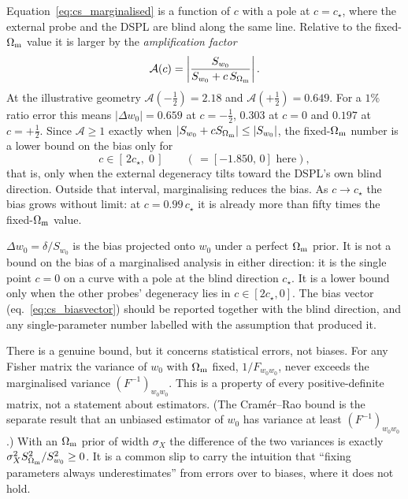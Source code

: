 Equation~\eqref{eq:cs_marginalised} is a function of $c$ with a pole at
$c=c_\star$, where the external probe and the DSPL are blind along the
same line. Relative to the fixed-$\Omega_{\mathrm{m}}$ value it is larger by the
\emph{amplification factor}
\begin{equation}
  \mathcal{A}(c)=\left|\frac{S_{w_0}}{S_{w_0}+c\,S_{\Omega_{\mathrm{m}}}}\right| .
  \label{eq:cs_amplification}
\end{equation}
At the illustrative geometry $\mathcal{A}(-\tfrac12)=2.18$ and
$\mathcal{A}(+\tfrac12)=0.649$. For a $1\%$ ratio error this means
$|\Delta w_0|=0.659$ at $c=-\tfrac12$, $0.303$ at $c=0$ and $0.197$ at
$c=+\tfrac12$. Since $\mathcal{A}\geq1$ exactly when
$|S_{w_0}+cS_{\Omega_{\mathrm{m}}}|\leq|S_{w_0}|$, the fixed-$\Omega_{\mathrm{m}}$ number is a
lower bound on the bias only for
\begin{equation}
  c\in[\,2c_\star,\;0\,]\qquad(\,=[-1.850,\,0]\text{ here}),
  \label{eq:cs_lb_interval}
\end{equation}
that is, only when the external degeneracy tilts toward the DSPL's own
blind direction. Outside that interval, marginalising reduces the
bias. As $c\to c_\star$ the bias grows without limit: at
$c=0.99\,c_\star$ it is already more than fifty times the
fixed-$\Omega_{\mathrm{m}}$ value.

\begin{keybox}
$\Delta w_0=\delta/S_{w_0}$ is the bias projected onto $w_0$ under a
perfect $\Omega_{\mathrm{m}}$ prior. It is not a bound on the bias of a
marginalised analysis in either direction: it is the single point $c=0$
on a curve with a pole at the blind direction $c_\star$. It is a lower
bound only when the other probes' degeneracy lies in
$c\in[2c_\star,0]$. The bias vector (eq.~\ref{eq:cs_biasvector}) should
be reported together with the blind direction, and any single-parameter
number labelled with the assumption that produced it.
\end{keybox}

There is a genuine bound, but it concerns statistical errors, not
biases. For any Fisher matrix the variance of $w_0$ with $\Omega_{\mathrm{m}}$
fixed, $1/F_{w_0w_0}$, never exceeds the marginalised variance
$(F^{-1})_{w_0w_0}$. This is a property of every positive-definite
matrix, not a statement about estimators. (The Cram\'er--Rao bound is
the separate result that an unbiased estimator of $w_0$ has variance at
least $(F^{-1})_{w_0w_0}$.) With an $\Omega_{\mathrm{m}}$ prior of width $\sigma_X$
the difference of the two variances is exactly
$\sigma_X^2S_{\Omega_{\mathrm{m}}}^2/S_{w_0}^2\geq0$. It is a common slip to carry
the intuition that ``fixing parameters always underestimates'' from
errors over to biases, where it does not hold.

